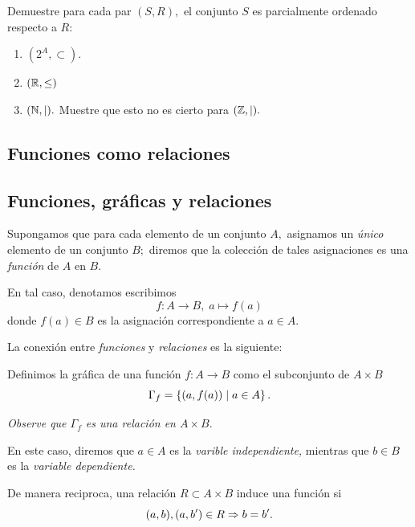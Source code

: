 	\begin{exmp}
		\label{lip:exmp:2.14}
		Demuestre para cada par $(S,R),$ el conjunto $S$ es parcialmente ordenado respecto a $R:$
		\begin{enumerate}%
			\item $(2^{A}, \subset).$ %
			
			\item $(\mathbb{R}, \leq )$
			\item $(\mathbb{N}, \mid).$  Muestre que esto no es cierto para $(\mathbb{Z}, \mid).$
		\end{enumerate}
		
	\end{exmp}
	


\subsection{Funciones como relaciones}

\subsection{Funciones, gr\'aficas y relaciones}

	Supongamos que para cada elemento de un conjunto $A,$ asignamos un \emph{\'unico} elemento de un conjunto $B;$ diremos que la colecci\'on de tales asignaciones es una \emph{funci\'on} de $A$ en $B.$ 
	
	
	En tal caso, denotamos escribimos 
	$$f:A\to B, \; a \mapsto f(a)$$
	donde $f(a)\in B$ es la asignaci\'on correspondiente a $a\in A.$



	La conexi\'on entre \emph{funciones} y \emph{relaciones} es la siguiente:
	
	
	Definimos la gr\'afica de una funci\'on $f:A\to B$ como el subconjunto de $A \times B$
	$$
	\Gamma_{f}=\left\{ (a, f(a)) \mid a \in A \right\}.
	$$
	
	
	\emph{Observe que $\Gamma_{f}$ es una relaci\'on en $A\times B.$}
	
	En este caso, diremos que $a\in A$ es la \emph{varible independiente,} mientras que $b\in B$ es la \emph{variable dependiente.}



	De manera reciproca, una relaci\'on $R\subset A \times B$ induce una funci\'on si 
	$$
	(a,b), (a,b')\in R \Rightarrow b=b'.
	$$
	
